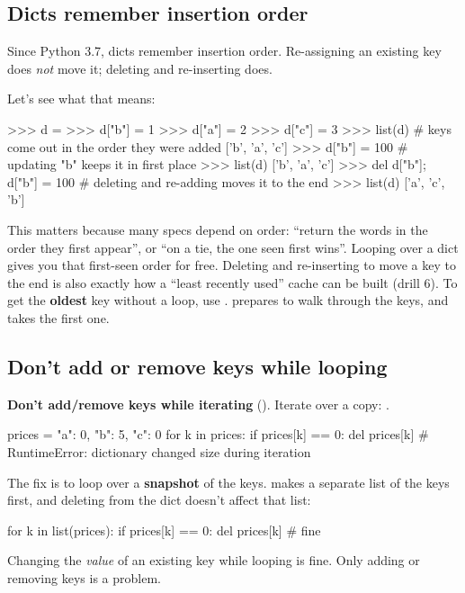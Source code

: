 \documentclass[10pt,a4paper]{article}
\begin{document}
\subsection{Dicts remember insertion order}
\begin{keybox}
Since Python 3.7, dicts remember insertion order. Re-assigning an existing key does \emph{not} move it; deleting and re-inserting does.
\end{keybox}
Let’s see what that means:
\begin{txtcode}
>>> d = {}
>>> d["b"] = 1
>>> d["a"] = 2
>>> d["c"] = 3
>>> list(d)                  # keys come out in the order they were added
['b', 'a', 'c']
>>> d["b"] = 100             # updating "b" keeps it in first place
>>> list(d)
['b', 'a', 'c']
>>> del d["b"]; d["b"] = 100 # deleting and re-adding moves it to the end
>>> list(d)
['a', 'c', 'b']
\end{txtcode}
This matters because many specs depend on order: “return the words in the order they first appear”, or “on a tie, the one seen first wins”. Looping over a dict gives you that first-seen order for free. Deleting and re-inserting to move a key to the end is also exactly how a “least recently used” cache can be built (drill 6).
To get the \textbf{oldest} key without a loop, use .  prepares to walk through the keys, and  takes the first one.
\subsection{Don’t add or remove keys while looping}
\begin{trapbox}
\textbf{Don’t add/remove keys while iterating} (). Iterate over a copy: .
\end{trapbox}
\begin{pycode}
prices = {"a": 0, "b": 5, "c": 0}
for k in prices:
    if prices[k] == 0:
        del prices[k]        # RuntimeError: dictionary changed size during iteration
\end{pycode}
The fix is to loop over a \textbf{snapshot} of the keys.  makes a separate list of the keys first, and deleting from the dict doesn’t affect that list:
\begin{pycode}
for k in list(prices):
    if prices[k] == 0:
        del prices[k]        # fine
\end{pycode}
Changing the \emph{value} of an existing key while looping is fine. Only adding or removing keys is a problem.
\setcounter{section}{2}
\end{document}
